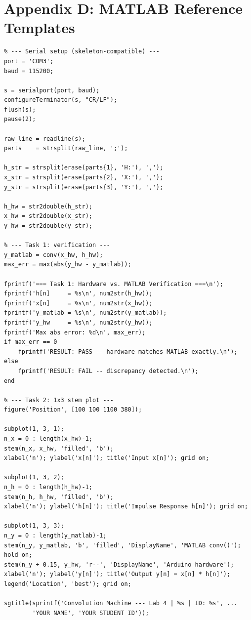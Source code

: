 \documentclass[11pt,letterpaper]{article}
\begin{document}
\section*{Appendix D: MATLAB Reference Templates}

\begin{verbatim}
% --- Serial setup (skeleton-compatible) ---
port = 'COM3';
baud = 115200;

s = serialport(port, baud);
configureTerminator(s, "CR/LF");
flush(s);
pause(2);

raw_line = readline(s);
parts    = strsplit(raw_line, ';');

h_str = strsplit(erase(parts{1}, 'H:'), ',');
x_str = strsplit(erase(parts{2}, 'X:'), ',');
y_str = strsplit(erase(parts{3}, 'Y:'), ',');

h_hw = str2double(h_str);
x_hw = str2double(x_str);
y_hw = str2double(y_str);

% --- Task 1: verification ---
y_matlab = conv(x_hw, h_hw);
max_err = max(abs(y_hw - y_matlab));

fprintf('=== Task 1: Hardware vs. MATLAB Verification ===\n');
fprintf('h[n]     = %s\n', num2str(h_hw));
fprintf('x[n]     = %s\n', num2str(x_hw));
fprintf('y_matlab = %s\n', num2str(y_matlab));
fprintf('y_hw     = %s\n', num2str(y_hw));
fprintf('Max abs error: %d\n', max_err);
if max_err == 0
    fprintf('RESULT: PASS -- hardware matches MATLAB exactly.\n');
else
    fprintf('RESULT: FAIL -- discrepancy detected.\n');
end

% --- Task 2: 1x3 stem plot ---
figure('Position', [100 100 1100 380]);

subplot(1, 3, 1);
n_x = 0 : length(x_hw)-1;
stem(n_x, x_hw, 'filled', 'b');
xlabel('n'); ylabel('x[n]'); title('Input x[n]'); grid on;

subplot(1, 3, 2);
n_h = 0 : length(h_hw)-1;
stem(n_h, h_hw, 'filled', 'b');
xlabel('n'); ylabel('h[n]'); title('Impulse Response h[n]'); grid on;

subplot(1, 3, 3);
n_y = 0 : length(y_matlab)-1;
stem(n_y, y_matlab, 'b', 'filled', 'DisplayName', 'MATLAB conv()');
hold on;
stem(n_y + 0.15, y_hw, 'r--', 'DisplayName', 'Arduino hardware');
xlabel('n'); ylabel('y[n]'); title('Output y[n] = x[n] * h[n]');
legend('Location', 'best'); grid on;

sgtitle(sprintf('Convolution Machine --- Lab 4 | %s | ID: %s', ...
        'YOUR NAME', 'YOUR STUDENT ID'));


\end{verbatim}
\end{document}
